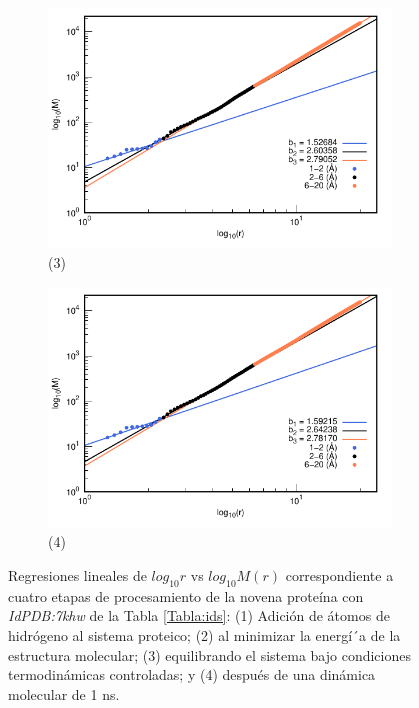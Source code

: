 \begin{figure}[H]
			\vspace{0cm} %
			
			\hspace{-0.3cm} 
			\begin{subfigure}{0.49\textwidth}
				\centering
				\includegraphics[width=\linewidth,page=1]{graphs/PDBs/7khw/7khwEq.pdf}
				\caption{(3)}
			\end{subfigure}
			\hspace{0.2cm}
			\begin{subfigure}{0.49\textwidth} %
				\centering
				\includegraphics[width=\linewidth,page=1]{graphs/PDBs/7khw/7khw1ns.pdf}
				\caption{(4)}
			\end{subfigure}
			\caption{Regresiones lineales de $log_{10}r$ vs $log_{10}M(r)$ correspondiente a cuatro etapas de procesamiento de la novena prote\'{i}na con \textit{IdPDB:7khw} de la Tabla \ref{Tabla:ids}: (1) Adici\'{o}n de \'{a}tomos de hidr\'{o}geno al sistema proteico; (2) al minimizar la energ\'{i´}a de la estructura molecular; (3) equilibrando el sistema bajo condiciones termodin\'{a}micas controladas; y (4) despu\'{e}s de una din\'{a}mica molecular de 1 ns.}
			\label{fig:7khw}
		\end{figure}
		
